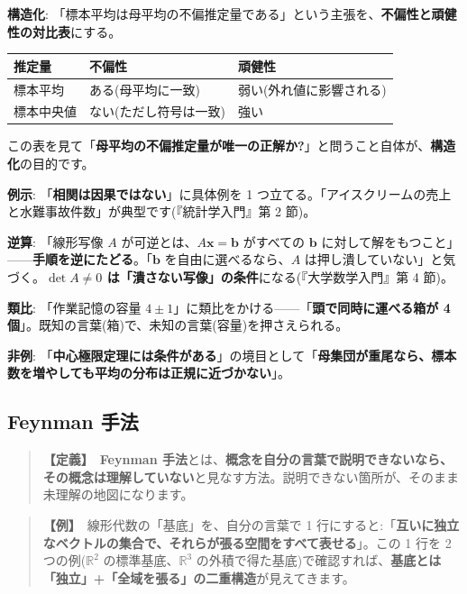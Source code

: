 \documentclass{article}
\begin{document}
\textbf{構造化}: 「標本平均は母平均の不偏推定量である」という主張を、\textbf{不偏性と頑健性の対比表}にする。

\begin{center}
\begin{tabular}{|l|l|l|}
\hline
推定量 & 不偏性 & 頑健性 \\
\hline
標本平均 & ある(母平均に一致) & 弱い(外れ値に影響される) \\
\hline
標本中央値 & ない(ただし符号は一致) & 強い \\
\hline
\end{tabular}
\end{center}

この表を見て「\textbf{母平均の不偏推定量が唯一の正解か?}」と問うこと自体が、\textbf{構造化}の目的です。

\textbf{例示}: 「\textbf{相関は因果ではない}」に具体例を 1 つ立てる。「アイスクリームの売上と水難事故件数」が典型です(『統計学入門』第 2 節)。

\textbf{逆算}: 「線形写像 \(A\) が可逆とは、\(A\boldsymbol{x} = \boldsymbol{b}\) がすべての \(\boldsymbol{b}\) に対して解をもつこと」——\textbf{手順を逆にたどる}。「\(\boldsymbol{b}\) を自由に選べるなら、\(A\) は押し潰していない」と気づく。\textbf{\(\det A \neq 0\) は「潰さない写像」の条件}になる(『大学数学入門』第 4 節)。

\textbf{類比}: 「作業記憶の容量 \(4 \pm 1\)」に類比をかける——「\textbf{頭で同時に運べる箱が 4 個}」。既知の言葉(箱)で、未知の言葉(容量)を押さえられる。

\textbf{非例}: 「\textbf{中心極限定理には条件がある}」の境目として「\textbf{母集団が重尾なら、標本数を増やしても平均の分布は正規に近づかない}」。

\subsection{Feynman 手法}

\begin{quote}
\textbf{【定義】}\ \textbf{Feynman 手法}とは、\textbf{概念を自分の言葉で説明できないなら、その概念は理解していない}と見なす方法。説明できない箇所が、そのまま未理解の地図になります。
\end{quote}

\begin{quote}
\textbf{【例】}\ 線形代数の「基底」を、自分の言葉で 1 行にすると:「\textbf{互いに独立なベクトルの集合で、それらが張る空間をすべて表せる}」。この 1 行を 2 つの例(\(\mathbb{R}^2\) の標準基底、\(\mathbb{R}^3\) の外積で得た基底)で確認すれば、\textbf{基底とは「独立」+「全域を張る」の二重構造}が見えてきます。
\end{quote}
\end{document}
